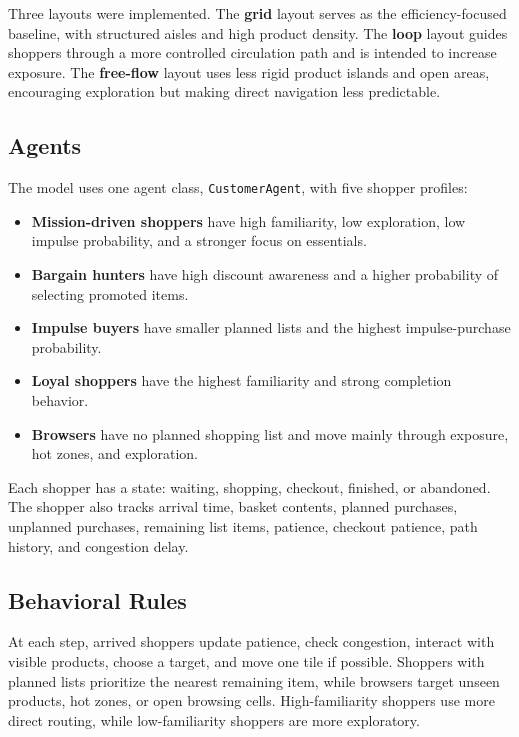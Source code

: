 \documentclass[sigconf,nonacm]{acmart}
\begin{document}
Three layouts were implemented. The \textbf{grid} layout serves as the efficiency-focused baseline, with structured aisles and high product density. The \textbf{loop} layout guides shoppers through a more controlled circulation path and is intended to increase exposure. The \textbf{free-flow} layout uses less rigid product islands and open areas, encouraging exploration but making direct navigation less predictable.

\subsection{Agents}

The model uses one agent class, \texttt{CustomerAgent}, with five shopper profiles:

\begin{itemize}
    \item \textbf{Mission-driven shoppers} have high familiarity, low exploration, low impulse probability, and a stronger focus on essentials.
    \item \textbf{Bargain hunters} have high discount awareness and a higher probability of selecting promoted items.
    \item \textbf{Impulse buyers} have smaller planned lists and the highest impulse-purchase probability.
    \item \textbf{Loyal shoppers} have the highest familiarity and strong completion behavior.
    \item \textbf{Browsers} have no planned shopping list and move mainly through exposure, hot zones, and exploration.
\end{itemize}

Each shopper has a state: waiting, shopping, checkout, finished, or abandoned. The shopper also tracks arrival time, basket contents, planned purchases, unplanned purchases, remaining list items, patience, checkout patience, path history, and congestion delay.

\subsection{Behavioral Rules}

At each step, arrived shoppers update patience, check congestion, interact with visible products, choose a target, and move one tile if possible. Shoppers with planned lists prioritize the nearest remaining item, while browsers target unseen products, hot zones, or open browsing cells. High-familiarity shoppers use more direct routing, while low-familiarity shoppers are more exploratory.
\end{document}
